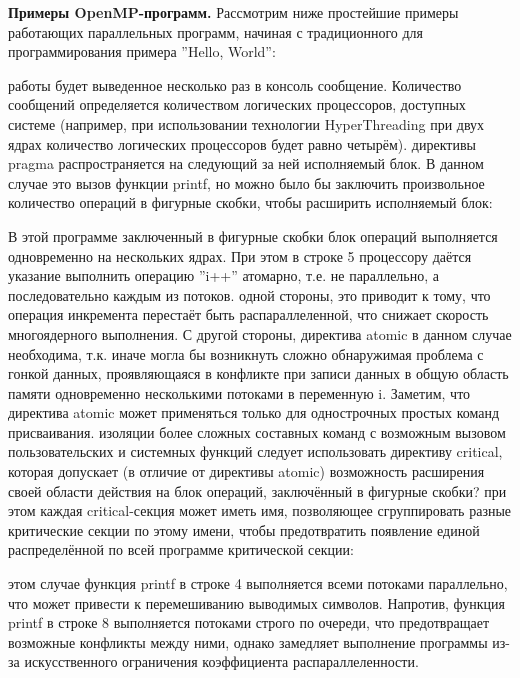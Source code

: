 {	\par\textbf{Примеры OpenMP-программ.} Рассмотрим ниже простейшие примеры работающих параллельных программ, начиная с традиционного для программирования примера ''Hello, World'':
	\begin{figure}[H]
		
	\end{figure}
	 работы будет выведенное несколько раз в консоль сообщение. Количество сообщений определяется количеством логических процессоров, доступных системе (например, при использовании технологии HyperThreading при двух ядрах количество логических процессоров будет равно четырём). 
	 директивы pragma распространяется на следующий за ней исполняемый блок. В данном случае это вызов функции printf, но можно было бы заключить произвольное количество операций в фигурные скобки, чтобы расширить исполняемый блок:
	\begin{figure}[H]
		
	\end{figure}
	В этой программе заключенный в фигурные скобки блок операций выполняется одновременно на нескольких ядрах. При этом в строке 5 процессору даётся указание выполнить операцию ''i++'' атомарно, т.е. не параллельно, а последовательно каждым из потоков. 
	 одной стороны, это приводит к тому, что операция инкремента перестаёт быть распараллеленной, что снижает скорость многоядерного выполнения. С другой стороны, директива atomic в данном случае необходима, т.к. иначе могла бы возникнуть сложно обнаружимая проблема с гонкой данных, проявляющаяся в конфликте при записи данных в общую область памяти одновременно несколькими потоками в переменную i. Заметим, что директива atomic может применяться только для однострочных простых команд присваивания. 
	 изоляции более сложных составных команд с возможным вызовом пользовательских и системных функций следует использовать директиву critical, которая допускает (в отличие от директивы atomic) возможность расширения своей области действия на блок операций, заключённый в фигурные скобки? при этом каждая critical-секция может иметь имя, позволяющее сгруппировать разные критические секции по этому имени, чтобы предотвратить появление единой распределённой по всей программе критической секции:
	\begin{figure}[H]
		
	\end{figure}
	 этом случае функция printf в строке 4 выполняется всеми потоками параллельно, что может привести к перемешиванию выводимых символов. Напротив, функция printf в строке 8 выполняется потоками строго по очереди, что предотвращает возможные конфликты между ними, однако замедляет выполнение программы из-за искусственного ограничения коэффициента распараллеленности.
}
